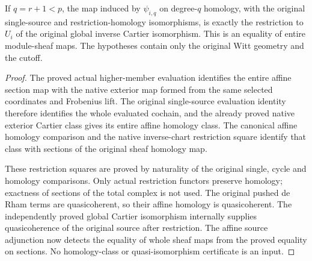 \begin{theorem}
\label{thm:di-actual-witt-higher-sheaf-cartier}
\leanok
{}
If $q=r+1<p$, the map induced by $\psi_{i,q}$ on degree-$q$ homology,
with the original single-source and restriction-homology isomorphisms,
is exactly the restriction to $U_i$ of the original global inverse
Cartier isomorphism. This is an equality of entire module-sheaf maps.
The hypotheses contain only the original Witt geometry and the cutoff.
\end{theorem}
\begin{proof}
\leanok
The proved actual higher-member evaluation identifies the entire affine
section map with the native exterior map formed from the same selected
coordinates and Frobenius lift. The original single-source evaluation
identity therefore identifies the whole evaluated cochain, and the
already proved native exterior Cartier class gives its entire affine
homology class. The canonical affine homology comparison and the native
inverse-chart restriction square identify that class with sections of
the original sheaf homology map.

These restriction squares are proved by naturality of the original
single, cycle and homology comparisons. Only actual restriction functors
preserve homology; exactness of sections of the total complex is not
used. The original pushed de Rham terms are quasicoherent, so their
affine homology is quasicoherent. The independently proved global
Cartier isomorphism internally supplies quasicoherence of the original
source after restriction. The affine source adjunction now detects the
equality of whole sheaf maps from the proved equality on sections.
No homology-class or quasi-isomorphism certificate is an input.
\end{proof}
